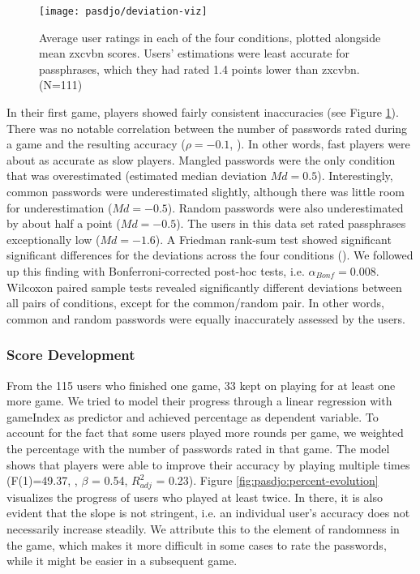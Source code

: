 \begin{figure}[tbp]
	\centering
	\texttt{[image: pasdjo/deviation-viz]}
	\caption{\label{fig:pasdjo:deviation-viz} Average user ratings in each of the four conditions, plotted alongside mean zxcvbn scores. Users' estimations were least accurate for passphrases, which they had rated 1.4 points lower than zxcvbn. (N=111) }
\end{figure}

In their first game, players showed fairly consistent inaccuracies (see Figure \ref{fig:pasdjo:deviation-viz}).
There was no notable correlation between the number of passwords rated during a game and the resulting accuracy ($\rho=-0.1$, ). In other words, fast players were about as accurate as slow players. Mangled passwords were the only condition that was overestimated (estimated median deviation $Md=0.5$). Interestingly, common passwords were underestimated slightly, although there was little room for underestimation ($Md=-0.5$). Random passwords were also underestimated by about half a point ($Md=-0.5$). The users in this data set rated passphrases exceptionally low ($Md = -1.6$). A Friedman rank-sum test showed significant significant differences for the deviations across the four conditions (). We followed up this finding with Bonferroni-corrected post-hoc tests, i.e. $\alpha_{Bonf}=0.008$. Wilcoxon paired sample tests revealed significantly different deviations between all pairs of conditions, except for the common/random pair. In other words, common and random passwords were equally inaccurately assessed by the users. 

\subsubsection{Score Development}
From the 115 users who finished one game, 33 kept on playing for at least one more game. We tried to model their progress through a linear regression with gameIndex as predictor and achieved percentage as dependent variable. To account for the fact that some users played more rounds per game, we weighted the percentage with the number of passwords rated in that game. The model shows that players were able to improve their accuracy by playing multiple times (F(1)=49.37, , $\beta$ = 0.54, $R^2_{adj}$ = 0.23). Figure \ref{fig:pasdjo:percent-evolution} visualizes the progress of users who played at least twice. In there, it is also evident that the slope is not stringent, i.e. an individual user's accuracy does not necessarily increase steadily. We attribute this to the element of randomness in the game, which makes it more difficult in some cases to rate the passwords, while it might be easier in a subsequent game. 

